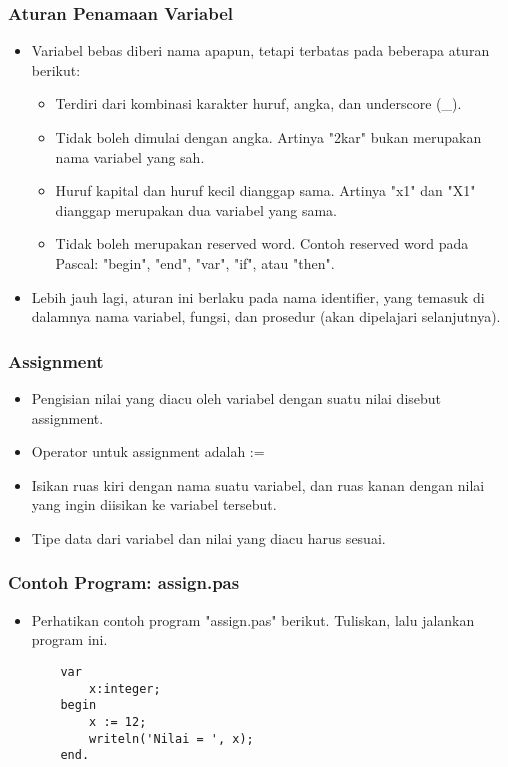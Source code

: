 \documentclass{beamer}
\begin{document}
\begin{frame}
\frametitle{Aturan Penamaan Variabel}
\begin{itemize}
	\item Variabel bebas diberi nama apapun, tetapi terbatas pada beberapa aturan berikut:
	\begin{itemize}
		\item Terdiri dari kombinasi karakter huruf, angka, dan underscore (\_).
		\item Tidak boleh dimulai dengan angka. Artinya "2kar" bukan merupakan nama variabel yang sah.
		\item Huruf kapital dan huruf kecil dianggap sama. Artinya "x1" dan "X1" dianggap merupakan dua variabel yang sama.
		\item Tidak boleh merupakan \alert{reserved word}. Contoh reserved word pada Pascal: "begin", "end", "var", "if", atau "then".
	\end{itemize}
	\item Lebih jauh lagi, aturan ini berlaku pada nama \alert{identifier}, yang temasuk di dalamnya nama variabel, fungsi, dan prosedur (akan dipelajari selanjutnya).
\end{itemize}
\end{frame}

\begin{frame}
\frametitle{Assignment}
\begin{itemize}
	\item Pengisian nilai yang diacu oleh variabel dengan suatu nilai disebut \alert{assignment}.
	\item Operator untuk assignment adalah :=
	\item Isikan ruas kiri dengan nama suatu variabel, dan ruas kanan dengan nilai yang ingin diisikan ke variabel tersebut.
	\item Tipe data dari variabel dan nilai yang diacu \alert{harus sesuai}.
\end{itemize}
\end{frame}


\begin{frame}[fragile]
\frametitle{Contoh Program: assign.pas}
\begin{itemize}
	\item Perhatikan contoh program "assign.pas" berikut. Tuliskan, lalu jalankan program ini.
	\begin{lstlisting}
	var
	    x:integer;
	begin
	    x := 12;
	    writeln('Nilai = ', x);
	end.
	\end{lstlisting}
\end{itemize}
\end{frame}
\end{document}
